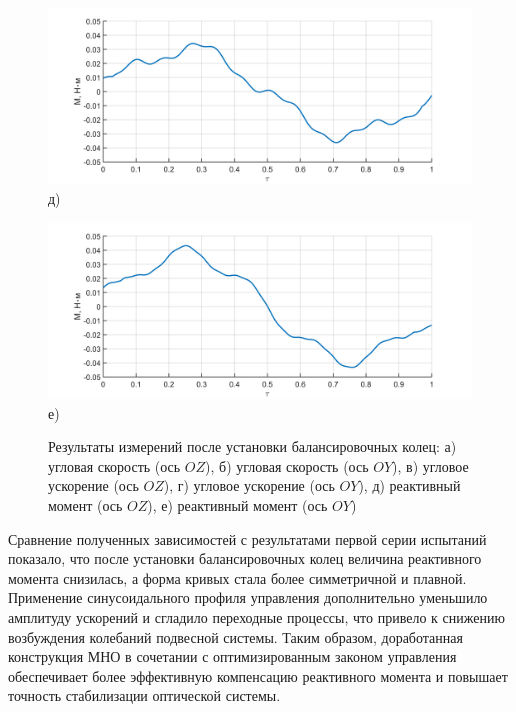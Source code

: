 \begin{figure}[h!]
	\begin{minipage}[b]{0.49\linewidth}\centering
	\includegraphics[width=\linewidth]{matlab/img/oz-gyro-sin-mom} \\ д)
	\end{minipage}
	\hfill
	\begin{minipage}[b]{0.49\linewidth}\centering
		\includegraphics[width=\linewidth]{matlab/img/oy-gyro-sin-mom} \\ е)
	\end{minipage}
	
	\caption{Результаты измерений после установки балансировочных колец:
	\newline а) угловая скорость (ось $OZ$), б) угловая скорость (ось $OY$), в) угловое ускорение (ось $OZ$), г)  угловое ускорение (ось $OY$), д) реактивный момент (ось $OZ$), е)  реактивный момент (ось $OY$)  }
	\label{fig:sin-profile-omn}
\end{figure}

Сравнение полученных зависимостей с результатами первой серии испытаний показало, что после установки балансировочных колец величина реактивного момента снизилась, а форма кривых стала более симметричной и плавной. Применение синусоидального профиля управления дополнительно уменьшило амплитуду ускорений и сгладило переходные процессы, что привело к снижению возбуждения колебаний подвесной системы. Таким образом, доработанная конструкция МНО в сочетании с оптимизированным законом управления обеспечивает более эффективную компенсацию реактивного момента и повышает точность стабилизации оптической системы.
 
